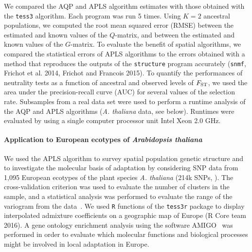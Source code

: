  We compared the AQP and APLS algorithm estimates with those obtained with the {\tt tess3} algorithm.  Each program was run 5 times.  Using $K = 2$ ancestral populations, we computed the root mean squared error (RMSE) between the estimated and known values of the $Q$-matrix, and between  the estimated and known values of the $G$-matrix. 
To evaluate the benefit of spatial algorithms, we compared the statistical errors of APLS algorithms to the errors obtained with a method that reproduces the outputs of the {\tt structure} program accurately ({\tt snmf}, Frichot et al. 2014, Frichot and Francois 2015).  To quantify the performances of neutrality tests as a function of ancestral and observed levels of $F_{\rm ST}$, we used the area under the precision-recall curve (AUC) for several values of the selection rate.  Subsamples from a real data set were used to perform a runtime analysis of the AQP and APLS algorithms ({\it A. thaliana} data, see below). Runtimes were evaluated by using a single computer processor unit Intel Xeon 2.0 GHz.

\paragraph{Application to European ecotypes of {\it Arabidopsis  thaliana}} We used  the APLS algorithm to survey spatial population genetic structure and to investigate the molecular basis of adaptation  by considering SNP data from 1,095  European ecotypes of the plant species {\it A. thaliana} (214k SNPs, \cite{Horton2012}). The cross-validation criterion was used to evaluate the number of clusters in the sample, and a statistical analysis was performed to evaluate the range of the variogram from the data~\citep{Cressie1993}. We used {\tt R} functions of the {\tt tess3r} package to display interpolated admixture coefficients on a geographic map of Europe (R Core team 2016). A gene ontology enrichment analysis using the software AMIGO~\citep{Carbon2009} was performed in order to evaluate which molecular functions and biological processes might be involved in local adaptation in Europe.







